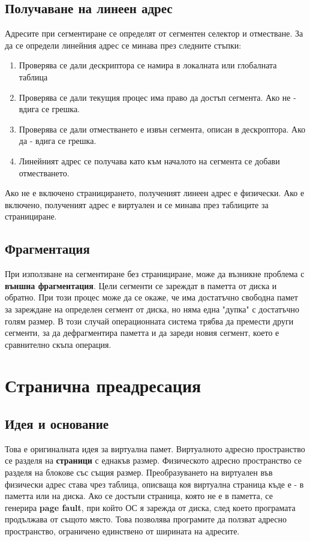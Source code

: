 \documentclass[fleqn,12pt]{article}
\begin{document}
\subsection{Получаване на линеен адрес}
Адресите при сегментиране се определят от сегментен селектор и отместване. За да се определи линейния адрес се минава през следните стъпки:
\begin{enumerate}
    \item Проверява се дали дескриптора се намира в локалната или глобалната таблица
    \item Проверява се дали текущия процес има право да достъп сегмента. Ако не - вдига се грешка.
    \item Проверява се дали отместването е извън сегмента, описан в дескроптора. Ако да - вдига се грешка.
    \item Линейният адрес се получава като към началото на сегмента се добави отместването.
\end{enumerate}

Ако не е включено страницирането, полученият линеен адрес е физически. Ако е включено, полученият адрес е виртуален и се минава 
през таблиците за странициране.

\subsection{Фрагментация}
При използване на сегментиране без странициране, може да възникне проблема с \textbf{външна фрагментация}. 
Цели сегменти се зареждат в паметта от диска и обратно. При този процес може да се окаже, че има достатъчно свободна 
памет за зареждане на определен сегмент от диска, но няма една "дупка" с достатъчно голям размер. В този случай
операционната система трябва да премести други сегменти, за да дефрагментира паметта и да зареди новия сегмент,
което е сравнително скъпа операция.

\section{Странична преадресация}

\subsection{Идея и основание}
Това е оригиналната идея за виртуална памет. Виртуалното адресно пространство се разделя на \textbf{страници} с еднакъв размер.
Физическото адресно пространство се разделя на блокове със същия размер. Преобразуването на виртуален във физически адрес 
става чрез таблица, описваща коя виртуална страница къде е - в паметта или на диска. Ако се достъпи страница, която не 
е в паметта, се генерира \textbf{page fault}, при който ОС я зарежда от диска, след което програмата продължава от същото място.
Това позволява програмите да ползват адресно пространство, ограничено единствено от ширината на адресите.
\end{document}
